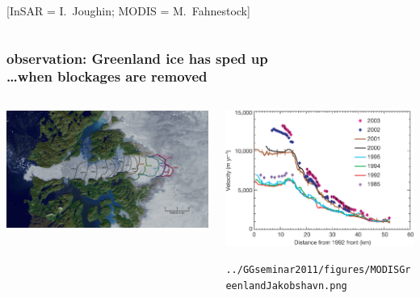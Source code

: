 \documentclass{beamer}
\begin{document}
\begin{frame}
\begin{columns}
\begin{column}{0.5\textwidth}
\begin{center}
    \tiny [InSAR = I.~Joughin; MODIS = M.~Fahnestock]
\end{center}
\end{column}
\end{columns}
\end{frame}


\begin{frame}
  \frametitle{observation: Greenland ice has sped up \\ \dots when blockages are removed}

\begin{columns}
\begin{column}{0.6\textwidth}
\begin{center}
  \includegraphics[width=\textwidth]{Jakobshavn_groundline_retreat}
\end{center}
\end{column}
\begin{column}{0.4\textwidth}
\begin{center}
  \includegraphics[width=\textwidth]{Jakobshavn_speedup}

\bigskip

  \texttt{../GGseminar2011/figures/MODISGreenlandJakobshavn.png}
\end{center}
\end{column}
\end{columns}
\end{frame}
\end{document}
